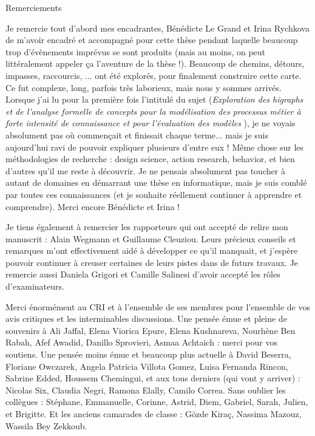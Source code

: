 \begin{center}
\begin{LARGE}
Remerciements
\end{LARGE}
\end{center}

\bigskip


\begin{small}

Je remercie tout d'abord mes encadrantes, Bénédicte Le Grand et Irina Rychkova de m'avoir encadré et accompagné pour cette thèse pendant laquelle beaucoup trop d'évènements imprévus se sont produits (mais au moins, on peut littéralement appeler ça l'aventure de la thèse !).
Beaucoup de chemins, détours, impasses, raccourcis, ... ont été explorés, pour finalement construire cette carte.
Ce fut complexe, long, parfois très laborieux, mais nous y sommes arrivés.
Lorsque j'ai lu pour la première fois l'intitulé du sujet (\og \textit{Exploration des higraphs et de l'analyse formelle de concepts pour la modélisation des processus métier à forte intensité de connaissance et pour l'évaluation des modèles} \fg), je ne voyais absolument pas où commençait et finissait chaque terme... mais je suis aujourd'hui ravi de pouvoir expliquer plusieurs d'entre eux !
Même chose sur les méthodologies de recherche : design science, action research, behavior, et bien d'autres qu'il me reste à découvrir.
Je ne pensais absolument pas toucher à autant de domaines en démarrant une thèse en informatique, mais je suis comblé par toutes ces connaissances (et je souhaite réellement continuer à apprendre et comprendre).
Merci encore Bénédicte et Irina !

\smallskip

Je tiens également à remercier les rapporteurs qui ont accepté de relire mon manuscrit : Alain Wegmann et Guillaume Cleuziou.
Leurs précieux conseils et remarques m'ont effectivement aidé à développer ce qu'il manquait, et j'espère pouvoir continuer à creuser certaines de leurs pistes dans de futurs travaux.
Je remercie aussi Daniela Grigori et Camille Salinesi d'avoir accepté les rôles d'examinateurs.

\smallskip

Merci énormément au CRI et à l'ensemble de ses membres pour l'ensemble de vos avis critiques et les interminables discussions.
Une pensée émue et pleine de souvenirs à Ali Jaffal, Elena Viorica Epure, Elena Kushnareva, Nourhène Ben Rabah, Afef Awadid, Danillo Sprovieri, Asmaa Achtaich : merci pour vos soutiens.
Une pensée moins émue et beaucoup plus actuelle à David Beserra, Floriane Owczarek, Angela Patricia Villota Gomez, Luisa Fernanda Rincon, Sabrine Edded, Houssem Chemingui, et aux tous derniers (qui vont y arriver) : Nicolas Six, Claudia Negri, Ramona Elally, Camilo Correa.
Sans oublier les collègues : Stéphane, Emmanuelle, Corinne, Astrid, Diem, Gabriel, Sarah, Julien, et Brigitte.
Et les anciens camarades de classe : Gözde Kiraç, Nassima Mazouz, Wassila Bey Zekkoub.


\end{small}
